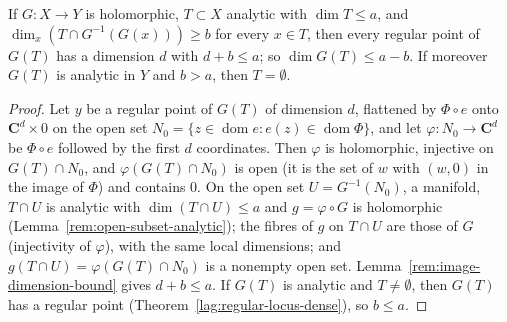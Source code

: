 \begin{lemma}
\label{rem:analytic-image-dimension}
\leanok
If \(G\colon X\to Y\) is holomorphic, \(T\subset X\) analytic with \(\dim T\le a\), and \(\dim_x(T\cap G^{-1}(G(x)))\ge b\) for every \(x\in T\), then every
regular point of \(G(T)\) has a dimension \(d\) with \(d+b\le a\); so \(\dim G(T)\le a-b\). If moreover \(G(T)\) is analytic in \(Y\) and \(b>a\), then \(T=\emptyset\).
\end{lemma}
\begin{proof}
\leanok
Let \(y\) be a regular point of \(G(T)\) of dimension \(d\), flattened by \(\Phi\circ e\) onto \(\mathbf C^d\times0\) on the open set \(N_0=\{z\in\operatorname{dom}e:
e(z)\in\operatorname{dom}\Phi\}\), and let \(\varphi\colon N_0\to\mathbf C^d\) be \(\Phi\circ e\) followed by the first \(d\) coordinates. Then \(\varphi\) is holomorphic,
injective on \(G(T)\cap N_0\), and \(\varphi(G(T)\cap N_0)\) is open (it is the set of \(w\) with \((w,0)\) in the image of \(\Phi\)) and contains \(0\). On the
open set \(U=G^{-1}(N_0)\), a manifold, \(T\cap U\) is analytic with \(\dim(T\cap U)\le a\) and \(g=\varphi\circ G\) is holomorphic
(Lemma~\ref{rem:open-subset-analytic}); the fibres of \(g\) on \(T\cap U\) are those of \(G\) (injectivity of \(\varphi\)), with the same local dimensions; and
\(g(T\cap U)=\varphi(G(T)\cap N_0)\) is a nonempty open set. Lemma~\ref{rem:image-dimension-bound} gives \(d+b\le a\). If \(G(T)\) is analytic and \(T\ne\emptyset\),
then \(G(T)\) has a regular point (Theorem~\ref{lag:regular-locus-dense}), so \(b\le a\).
\end{proof}

